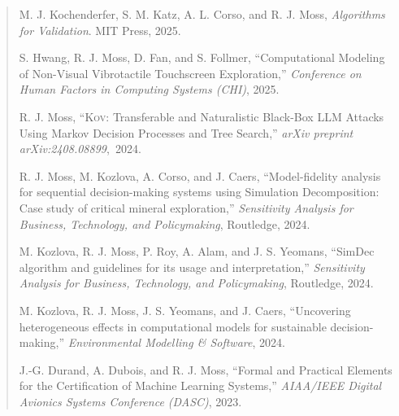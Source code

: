\begin{quote}
    \cite{valbook} M. J. Kochenderfer, S. M. Katz, A. L. Corso, and R. J. Moss, \textit{Algorithms for Validation}. MIT Press, 2025.\\

    \phantom{---}

    S. Hwang, R. J. Moss, D. Fan, and S. Follmer, ``Computational Modeling of Non-Visual Vibrotactile Touchscreen Exploration,'' \textit{Conference on Human Factors in Computing Systems (CHI)}, 2025.\\

    \phantom{---}

    R. J. Moss, ``\textsc{Kov}: Transferable and Naturalistic Black-Box LLM Attacks Using Markov Decision Processes and Tree Search,'' \textit{arXiv preprint arXiv:2408.08899},~2024.\\

    \phantom{---}

    R. J. Moss, M. Kozlova, A. Corso, and J. Caers, ``Model-fidelity analysis for sequential decision-making systems using Simulation Decomposition: Case study of critical mineral exploration,'' \textit{Sensitivity Analysis for Business, Technology, and Policymaking}, Routledge, 2024.\\

    \phantom{---}

    M. Kozlova, R. J. Moss, P. Roy, A. Alam, and J. S. Yeomans, ``SimDec algorithm and guidelines for its usage and interpretation,'' \textit{Sensitivity Analysis for Business, Technology, and Policymaking}, Routledge, 2024.\\

    \phantom{---}

    M. Kozlova, R. J. Moss, J. S. Yeomans, and J. Caers, ``Uncovering heterogeneous effects in computational models for sustainable decision-making,'' \textit{Environmental Modelling \& Software}, 2024.\\

    \phantom{---}

    \cite{durand2023formal} J.-G. Durand, A. Dubois, and R. J. Moss, ``Formal and Practical Elements for the Certification of Machine Learning Systems,'' \textit{AIAA/IEEE Digital Avionics Systems Conference (DASC)}, 2023.\\


\end{quote}
